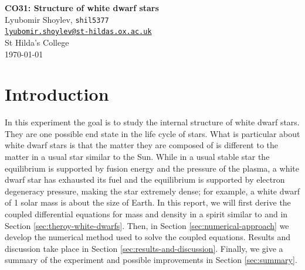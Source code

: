 \documentclass[]{article}
\begin{document}


\begin{center}
	\Large{\textbf{CO31: Structure of white dwarf stars}\\
	\vspace{1em}
	\large{Lyubomir Shoylev, \texttt{shil5377}}\\ \href{mailto:me@example.com}{\texttt{lyubomir.shoylev@st-hildas.ox.ac.uk}}}\\
	\large{St Hilda's College}\\
	\today
\end{center}

\begin{abstract}
	This will be the abstract of the report. It shall be written when the rest is nearly done.
\end{abstract}

\section{Introduction}
	In this experiment the goal is to study the internal structure of white dwarf stars. They are one possible end state in the life cycle of stars. What is particular about white dwarf stars is that the matter they are composed of is different to the matter in a usual star similar to the Sun. While in a usual stable star the equilibrium is supported by fusion energy and the pressure of the plasma, a white dwarf star has exhausted its fuel and the equilibrium is supported by electron degeneracy pressure, making the star extremely dense; for example, a white dwarf of 1 solar mass is about the size of Earth. In this report, we will first derive the coupled differential equations for mass and density in a spirit similar to \cite{OxfPhys2020} and \cite{Chandrasekhar1984} in Section \ref{sec:theroy-white-dwarfs}. Then, in Section \ref{sec:numerical-approach} we develop the numerical method used to solve the coupled equations. Results and discussion take place in Section \ref{sec:results-and-discussion}. Finally, we give a summary of the experiment and possible improvements in Section \ref{sec:summary}.
\end{document}

